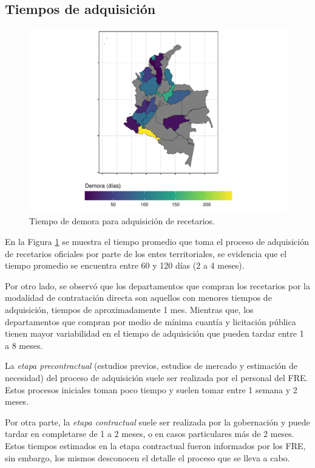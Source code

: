 \documentclass[
]{book}
\begin{document}
\hypertarget{tiempos-de-adquisiciuxf3n}{%
\subsection{Tiempos de adquisición}\label{tiempos-de-adquisiciuxf3n}}

\begin{figure}

{\centering \includegraphics[width=0.85\linewidth]{InformeFinal_files/figure-latex/tiempoDemoraAdquisicion-1} 

}

\caption{Tiempo de demora para adquisición de recetarios.}\label{fig:tiempoDemoraAdquisicion}
\end{figure}

En la Figura \ref{fig:tiempoDemoraAdquisicion} se muestra el tiempo promedio que toma el proceso de adquisición de recetarios oficiales por parte de los entes territoriales, se evidencia que el tiempo promedio se encuentra entre 60 y 120 días (2 a 4 meses).

Por otro lado, se observó que los departamentos que compran los recetarios por la modalidad de contratación directa son aquellos con menores tiempos de adquisición, tiempos de aproximadamente 1 mes. Mientras que, los departamentos que compran por medio de mínima cuantía y licitación pública tienen mayor variabilidad en el tiempo de adquisición que pueden tardar entre 1 a 8 meses.

La \emph{etapa precontractual} (estudios previos, estudios de mercado y estimación de necesidad) del proceso de adquisición suele ser realizada por el personal del FRE. Estos procesos iniciales toman poco tiempo y suelen tomar entre 1 semana y 2 meses.

Por otra parte, la \emph{etapa contractual} suele ser realizada por la gobernación y puede tardar en completarse de 1 a 2 meses, o en casos particulares más de 2 meses. Estos tiempos estimados en la etapa contractual fueron informados por los FRE, sin embargo, los mismos desconocen el detalle el proceso que se lleva a cabo.
\end{document}
